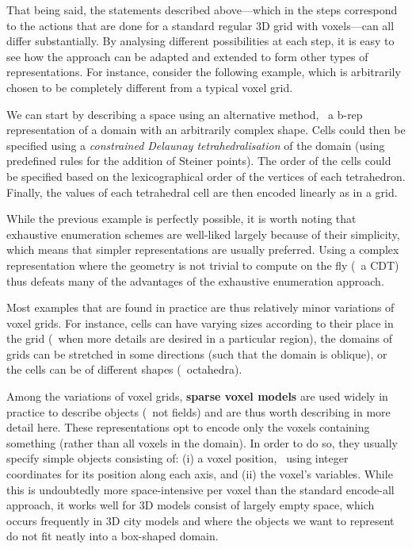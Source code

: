That being said, the statements described above---which in the steps correspond to the actions that are done for a standard regular 3D grid with voxels---can all differ substantially.
By analysing different possibilities at each step, it is easy to see how the approach can be adapted and extended to form other types of representations.
For instance, consider the following example, which is arbitrarily chosen to be completely different from a typical voxel grid.

We can start by describing a space using an alternative method, \eg\ a b-rep representation of a domain with an arbitrarily complex shape.
Cells could then be specified using a \emph{constrained Delaunay tetrahedralisation} of the domain (using predefined rules for the addition of Steiner points).
The order of the cells could be specified based on the lexicographical order of the vertices of each tetrahedron.
Finally, the values of each tetrahedral cell are then encoded linearly as in a grid.

While the previous example is perfectly possible, it is worth noting that exhaustive enumeration schemes are well-liked largely because of their simplicity, which means that simpler representations are usually preferred.
Using a complex representation where the geometry is not trivial to compute on the fly (\eg\ a CDT) thus defeats many of the advantages of the exhaustive enumeration approach.

Most examples that are found in practice are thus relatively minor variations of voxel grids.
For instance, cells can have varying sizes according to their place in the grid (\eg\ when more details are desired in a particular region), the domains of grids can be stretched in some directions (such that the domain is oblique), or the cells can be of different shapes (\eg\ octahedra).

Among the variations of voxel grids, \textbf{sparse voxel models} are used widely in practice to describe objects (\ie\ not fields) and are thus worth describing in more detail here.
These representations opt to encode only the voxels containing something (rather than all voxels in the domain).
In order to do so, they usually specify simple objects consisting of: (i) a voxel position, \eg\ using integer coordinates for its position along each axis, and (ii) the voxel's variables.
While this is undoubtedly more space-intensive per voxel than the standard encode-all approach, it works well for 3D models consist of largely empty space, which occurs frequently in 3D city models and where the objects we want to represent do not fit neatly into a box-shaped domain.

